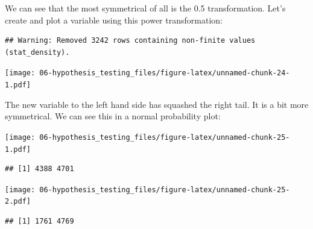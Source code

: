 \documentclass[
]{book}
\newenvironment{Shaded}{\begin{snugshade}}{\end{snugshade}}
\newcommand{\AttributeTok}[1]{\textcolor[rgb]{0.77,0.63,0.00}{#1}}
\newcommand{\FloatTok}[1]{\textcolor[rgb]{0.00,0.00,0.81}{#1}}
\newcommand{\FunctionTok}[1]{\textcolor[rgb]{0.00,0.00,0.00}{#1}}
\newcommand{\NormalTok}[1]{#1}
\newcommand{\OtherTok}[1]{\textcolor[rgb]{0.56,0.35,0.01}{#1}}
\newcommand{\SpecialCharTok}[1]{\textcolor[rgb]{0.00,0.00,0.00}{#1}}
\begin{document}
We can see that the most symmetrical of all is the 0.5 transformation. Let's create and plot a variable using this power transformation:

\begin{Shaded}
\end{Shaded}

\begin{verbatim}
## Warning: Removed 3242 rows containing non-finite values (stat_density).
\end{verbatim}

\texttt{[image: 06-hypothesis\_testing\_files/figure-latex/unnamed-chunk-24-1.pdf]}

The new variable to the left hand side has squashed the right tail. It is a bit more symmetrical. We can see this in a normal probability plot:

\begin{Shaded}
\end{Shaded}

\texttt{[image: 06-hypothesis\_testing\_files/figure-latex/unnamed-chunk-25-1.pdf]}

\begin{verbatim}
## [1] 4388 4701
\end{verbatim}

\begin{Shaded}
\end{Shaded}

\texttt{[image: 06-hypothesis\_testing\_files/figure-latex/unnamed-chunk-25-2.pdf]}

\begin{verbatim}
## [1] 1761 4769
\end{verbatim}
\end{document}
